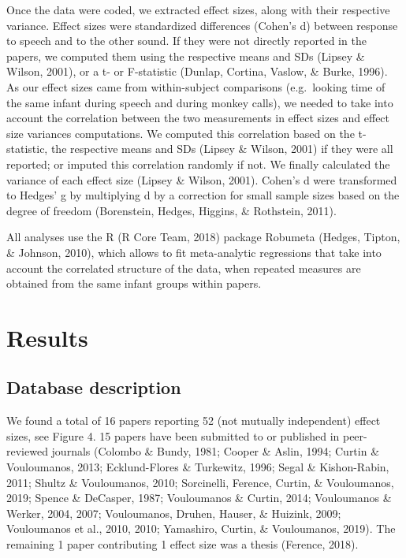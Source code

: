 \documentclass[man]{apa6}
\begin{document}
Once the data were coded, we extracted effect sizes, along with their
respective variance. Effect sizes were standardized differences (Cohen's
d) between response to speech and to the other sound. If they were not
directly reported in the papers, we computed them using the respective
means and SDs (Lipsey \& Wilson, 2001), or a t- or F-statistic (Dunlap,
Cortina, Vaslow, \& Burke, 1996). As our effect sizes came from
within-subject comparisons (e.g.~looking time of the same infant during
speech and during monkey calls), we needed to take into account the
correlation between the two measurements in effect sizes and effect size
variances computations. We computed this correlation based on the
t-statistic, the respective means and SDs (Lipsey \& Wilson, 2001) if
they were all reported; or imputed this correlation randomly if not. We
finally calculated the variance of each effect size (Lipsey \& Wilson,
2001). Cohen's d were transformed to Hedges' g by multiplying d by a
correction for small sample sizes based on the degree of freedom
(Borenstein, Hedges, Higgins, \& Rothstein, 2011).

All analyses use the R (R Core Team, 2018) package Robumeta (Hedges,
Tipton, \& Johnson, 2010), which allows to fit meta-analytic regressions
that take into account the correlated structure of the data, when
repeated measures are obtained from the same infant groups within
papers.

\section{Results}\label{results}

\subsection{Database description}\label{database-description}

We found a total of 16 papers reporting 52 (not mutually independent)
effect sizes, see Figure 4. 15 papers have been submitted to or
published in peer-reviewed journals (Colombo \& Bundy, 1981; Cooper \&
Aslin, 1994; Curtin \& Vouloumanos, 2013; Ecklund-Flores \& Turkewitz,
1996; Segal \& Kishon-Rabin, 2011; Shultz \& Vouloumanos, 2010;
Sorcinelli, Ference, Curtin, \& Vouloumanos, 2019; Spence \& DeCasper,
1987; Vouloumanos \& Curtin, 2014; Vouloumanos \& Werker, 2004, 2007;
Vouloumanos, Druhen, Hauser, \& Huizink, 2009; Vouloumanos et al., 2010,
2010; Yamashiro, Curtin, \& Vouloumanos, 2019). The remaining 1 paper
contributing 1 effect size was a thesis (Ference, 2018).
\end{document}
